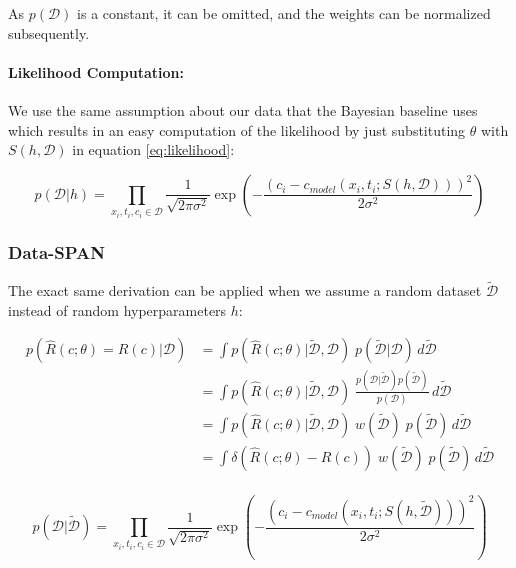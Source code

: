 \documentclass{article}
\begin{document}
As $p(\mathcal{D})$ is a constant, it can be omitted, and the weights can be normalized subsequently.


\paragraph{Likelihood Computation:}
We use the same assumption about our data that the Bayesian baseline uses which results in an easy computation of the likelihood by just substituting $\theta$ with $S(h, \mathcal{D})$ in equation \eqref{eq:likelihood}:

\begin{equation*}
p(\mathcal{D} | h) = \prod_{x_i, t_i, c_i \in \mathcal{D}} \frac{1}{\sqrt{2\pi \sigma^2}} \exp \left( -\frac{(c_i - c_{model}(x_i, t_i; S(h, \mathcal{D})))^2}{2\sigma^2} \right)
\end{equation*}



\subsubsection{Data-SPAN}
The exact same derivation can be applied when we assume a random dataset $\tilde{\mathcal{D}}$ instead of random hyperparameters $h$:

\begin{align*}
    p(\hat{R}(c; \theta) = R(c)| \mathcal{D}) &= \int p(\hat{R}(c; \theta) | \tilde{\mathcal{D}}, \mathcal{D})\; p(\tilde{\mathcal{D}} | \mathcal{D}) \, d \tilde{\mathcal{D}} \\
                                              &= \int p(\hat{R}(c; \theta) | \tilde{\mathcal{D}}, \mathcal{D})\; \frac{p(\mathcal{D} | \tilde{\mathcal{D}}) p(\tilde{\mathcal{D}})}{p(\mathcal{D})} \, d \tilde{\mathcal{D}} \\
                                              &= \int p(\hat{R}(c; \theta) | \tilde{\mathcal{D}}, \mathcal{D})\; w(\tilde{\mathcal{D}})\; p(\tilde{\mathcal{D}}) \, d \tilde{\mathcal{D}} \\
                                              &= \int \delta(\hat{R}(c; \theta) - R(c))\; w(\tilde{\mathcal{D}})\; p(\tilde{\mathcal{D}}) \, d \tilde{\mathcal{D}} \\
\end{align*}

\begin{equation*}
    p(\mathcal{D} | \tilde{\mathcal{D}}) = \prod_{x_i, t_i, c_i \in \mathcal{D}} \frac{1}{\sqrt{2\pi \sigma^2}} \exp \left( -\frac{(c_i - c_{model}(x_i, t_i; S(h, \tilde{\mathcal{D}})))^2}{2\sigma^2} \right)
\end{equation*}
\end{document}
